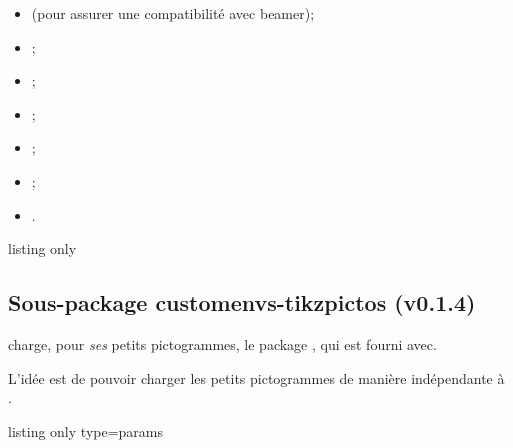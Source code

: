 \documentclass[french,11pt,a4paper]{article}
\begin{document}
\begin{itemize}
	\item {} (pour assurer une compatibilité avec \textsf{beamer});
	\item {} ;
	\item {} ;
	\item {} ;
	\item {} ;
	\item {} ;
	\item {}.
\end{itemize}

\begin{DemoCode}{listing only}
\usepackage{customenvs}

\usepackage[option(s)]{customenvs}
\end{DemoCode}

\subsection{Sous-package customenvs-tikzpictos (v0.1.4)}

 charge, pour \textit{ses} petits pictogrammes, le package , qui est fourni avec.

L'idée est de pouvoir charger les petits pictogrammes de manière indépendante à .

\begin{DemoCode}{listing only}
	{type=params}

\end{DemoCode}
\end{document}
